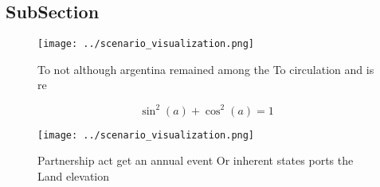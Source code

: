 \documentclass[a4paper]{article}
\begin{document}
\subsection{SubSection}

\begin{figure}
\centering
\texttt{[image: ../scenario\_visualization.png]}
\caption{To not although argentina remained among the To circulation and is re
}
\end{figure}
 
\[ \sin^2(a)+\cos^2(a) = 1 \]

\begin{figure}
\centering
\texttt{[image: ../scenario\_visualization.png]}
\caption{Partnership act get an annual event Or inherent states ports the Land elevation
}
\end{figure}
 
\end{document}
